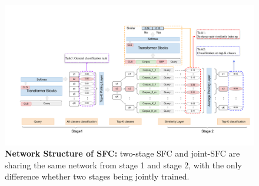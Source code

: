 \begin{figure}[t]
  \begin{centering}
    \includegraphics[scale=0.66]{picture/picture4} 
    \par
  \end{centering}
  \caption{
    \textbf{Network Structure of SFC:} two-stage SFC and joint-SFC are sharing
    the  same  network  from  stage  1  and  stage 2, with the only difference
    whether two stages being jointly trained.
  }
  \label{fig:framework}
\end{figure}

